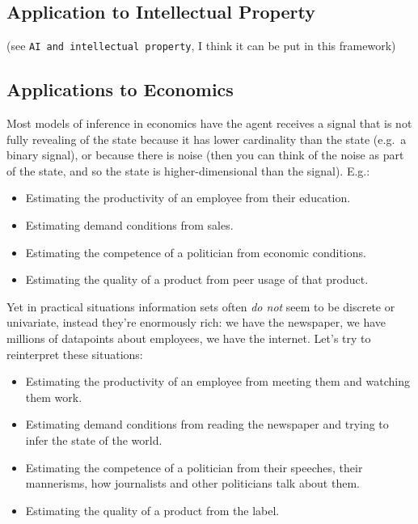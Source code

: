 \documentclass[
  10pt,
  letterpaper,
  DIV=11,
  numbers=noendperiod,
  oneside]{scrartcl}
\providecommand{\tightlist}{%
  \setlength{\itemsep}{0pt}\setlength{\parskip}{0pt}}\usepackage{longtable,booktabs,array}
\begin{document}
\subsection{Application to Intellectual
Property}\label{application-to-intellectual-property}

(see \texttt{AI\ and\ intellectual\ property}, I think it can be put in
this framework)

\subsection{Applications to Economics}\label{applications-to-economics}

Most models of inference in economics have the agent receives a signal
that is not fully revealing of the state because it has lower
cardinality than the state (e.g.~a binary signal), or because there is
noise (then you can think of the noise as part of the state, and so the
state is higher-dimensional than the signal). E.g.:

\begin{itemize}
\tightlist
\item
  Estimating the productivity of an employee from their education.
\item
  Estimating demand conditions from sales.
\item
  Estimating the competence of a politician from economic conditions.
\item
  Estimating the quality of a product from peer usage of that product.
\end{itemize}

Yet in practical situations information sets often \emph{do not} seem to
be discrete or univariate, instead they're enormously rich: we have the
newspaper, we have millions of datapoints about employees, we have the
internet. Let's try to reinterpret these situations:

\begin{itemize}
\tightlist
\item
  Estimating the productivity of an employee from meeting them and
  watching them work.
\item
  Estimating demand conditions from reading the newspaper and trying to
  infer the state of the world.
\item
  Estimating the competence of a politician from their speeches, their
  mannerisms, how journalists and other politicians talk about them.
\item
  Estimating the quality of a product from the label.
\end{itemize}
\end{document}
